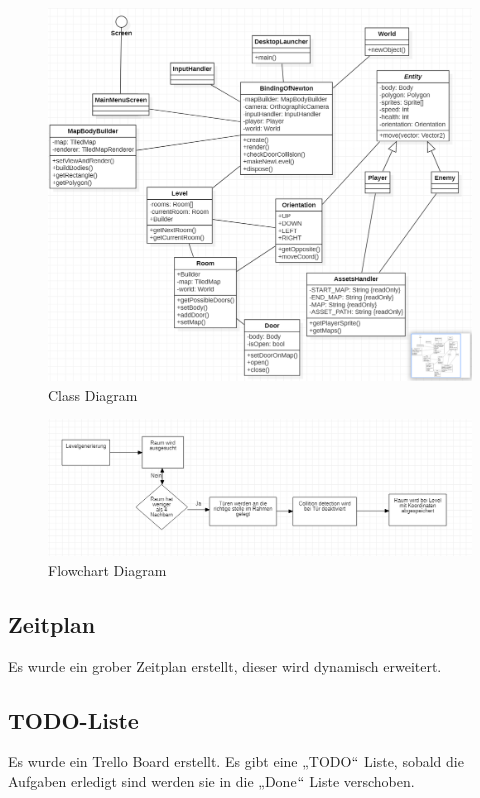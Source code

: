 \documentclass[12pt]{article}
\begin{document}
\begin{figure}[H]
    \centering
    \caption{Class Diagram}
    \includegraphics[scale=0.3]{class.png}
\end{figure}

\begin{figure}[H]
    \centering
    \caption{Flowchart Diagram}
    \includegraphics[scale=0.4]{flow.png}
\end{figure}

\subsection{Zeitplan}
Es wurde ein grober Zeitplan erstellt, dieser wird dynamisch erweitert. 

\subsection{TODO-Liste }
Es wurde ein Trello Board erstellt. Es gibt eine „TODO$``$ Liste, sobald die Aufgaben erledigt sind werden sie in die „Done$``$ Liste verschoben.
\end{document}
